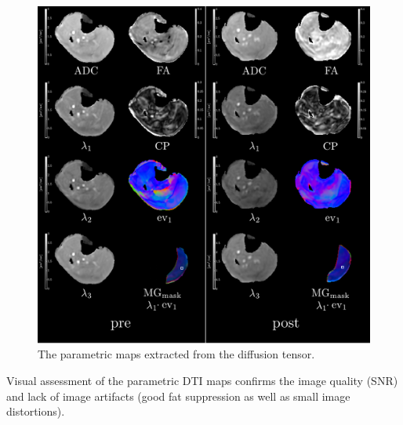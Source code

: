 \begin{figure}[!htb]
\vspace{+0.2cm}
\centering
\includegraphics[width=\textwidth]{Figures/DTI_2compart.pdf}
\caption[The parametric maps extracted from the diffusion tensor]{The parametric maps extracted from the diffusion tensor.}
\label{fig: KargerEV}
\end{figure}
Visual assessment of the parametric DTI maps confirms the image quality (SNR) and lack of image artifacts (good fat suppression as well as small image distortions).

